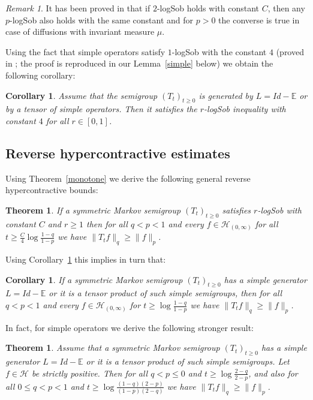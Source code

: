 \documentclass[11pt]{amsart}
\newcommand{\E}{\mathbb{E}}
\newcommand{\1}{\mathbf{1}}
\def\E{{\mathbb E}}
\def\H{{\mathcal{H}}}
\theoremstyle{definition}
\theoremstyle{plain}
\newtheorem{theorem}[example]{Theorem}
\newtheorem{corollary}[example]{Corollary}
\theoremstyle{remark}
\newtheorem{remark}[example]{Remark}
\numberwithin{equation}{section}
\begin{document}
\begin{remark}
It has been proved in \cite[Proposition 3.1]{Bakry:94} that if $2$-logSob holds with constant $C$,
then any $p$-logSob also holds with the same constant and for $p>0$ the converse is true in case of
diffusions with invariant measure $\mu$. 
\end{remark}

Using the fact that simple operators satisfy $1$-logSob with the constant $4$ (proved in  \cite{BobkovTetali06}; the proof is reproduced in our Lemma~\ref{simple} below)
we obtain the following corollary:
\begin{corollary} \label{cor_simple}
Assume that the semigroup $(T_{t})_{t \geq 0}$ is generated by $L=Id-\E$ or by a tensor of simple operators.
 Then it satisfies the $r$-logSob inequality with constant $4$ for all $r \in [0,1]$.
\end{corollary}


\subsection{Reverse hypercontractive estimates}
Using Theorem~\ref{monotone} we derive the following general reverse hypercontractive bounds:

\begin{theorem} \label{thm:1ls->revhyp}
If a symmetric Markov semigroup $(T_{t})_{t \geq 0}$ satisfies $r$-logSob with constant $C$ and $r \geq 1$ then for all
$q<p<1$ and every $f \in \H_{(0,\infty)}$ for all
$t \geq \frac{C}{4}\log \frac{1-q}{1-p}$ we have
$\| T_{t}f\|_{q} \geq \| f\|_{p}$.
\end{theorem}

Using Corollary~\ref{cor_simple} this implies in turn that:

\begin{corollary} \label{simrevhyp}
If a symmetric Markov semigroup $(T_{t})_{t \geq 0}$ has a simple generator $L=Id-\E$ or it is a tensor product of such simple semigroups,
then for all $q<p<1$ and every $f \in \H_{(0,\infty)}$ for $t \geq \log \frac{1-q}{1-p}$ we have
$\| T_{t}f\|_{q} \geq \| f\|_{p}$.
\end{corollary}

In fact, for simple operators we derive the following stronger result:

\begin{theorem} \label{simrevhyp_strong}
Assume that a symmetric Markov semigroup
$(T_{t})_{t \geq 0}$ has a simple generator $L=Id-\E$ or it is a tensor product of such simple semigroups. Let
$f \in \H$ be strictly positive.
Then for all $q<p \leq 0$ and $t \geq \log \frac{2-q}{2-p}$, and also for all $0 \leq q<p<1$ and
$t \geq \log \frac{(1-q)(2-p)}{(1-p)(2-q)}$
we have
$\| T_{t}f\|_{q} \geq \| f\|_{p}$.
\end{theorem}
\end{document}

